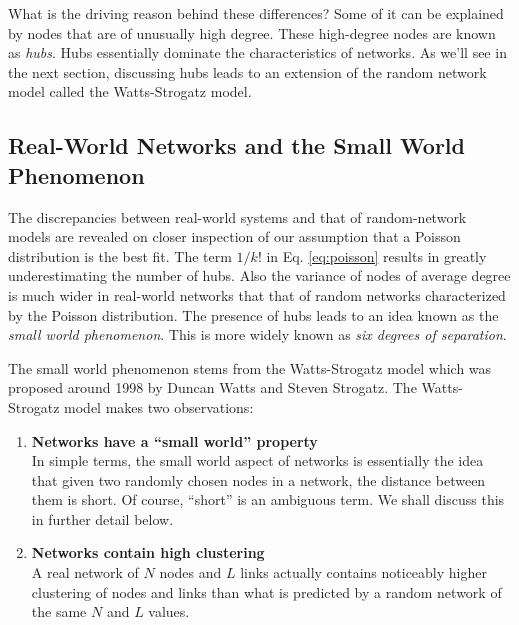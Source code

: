 \documentclass{article}
\begin{document}
What is the driving reason behind these differences?  Some of it can be explained by nodes that are of unusually high degree.  These high-degree nodes are known as \textit{hubs}. Hubs essentially dominate the characteristics of networks.  As we'll see in the next section, discussing hubs leads to an extension of the random network model called the Watts-Strogatz model.




\subsection{Real-World Networks and the Small World Phenomenon}

The discrepancies between real-world systems and that of random-network models are revealed on closer inspection of our assumption that a Poisson distribution is the best fit.  The term $1 / k!$ in Eq. \ref{eq:poisson} results in greatly underestimating the number of hubs. Also the variance of nodes of average degree is much wider in real-world networks that that of random networks characterized by the Poisson distribution.  The presence of hubs leads to an idea known as the \textit{small world phenomenon}.  This is more widely known as \textit{six degrees of separation}.

The small world phenomenon stems from the Watts-Strogatz model which was proposed around 1998 \cite{ns} by Duncan Watts and Steven Strogatz.  The Watts-Strogatz model makes two observations:

\begin{enumerate}
    \item \textbf{Networks have a ``small world'' property}\\
    In simple terms, the small world aspect of networks is essentially the idea that given two randomly chosen nodes in a network, the distance between them is short.  Of course, ``short'' is an ambiguous term.  We shall discuss this in further detail below.
    
    \item \textbf{Networks contain high clustering}\\
    A real network of $N$ nodes and $L$ links actually contains noticeably higher clustering of nodes and links than what is predicted by a random network of the same $N$ and $L$ values.
    
\end{enumerate}
\end{document}
